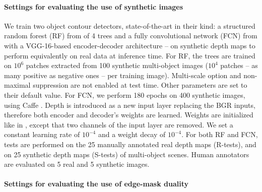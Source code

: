 \documentclass[runningheads,a4paper]{llncs}
\begin{document}
\paragraph{Settings for evaluating the use of synthetic images}

We train two object contour detectors, state-of-the-art in their kind: a structured random forest (RF) from \cite{DollarZ14} of 4 trees and a fully convolutional network (FCN) from \cite{Yang2016CEDN} with a VGG-16-based encoder-decoder architecture -- on synthetic depth maps to perform equivalently on real data at inference time. For RF, the trees are trained on $10^6$ patches extracted from 100 synthetic multi-object images ($10^4$ patches -- as many positive as negative ones -- per training image). Multi-scale option and non-maximal suppression are not enabled at test time. Other parameters are set to their default value. For FCN, we perform 180 epochs on 400 synthetic images, using Caffe \cite{jia2014caffe}. Depth is introduced as a new input layer replacing the BGR inputs, therefore both encoder and decoder's weights are learned. Weights are initialized like in \cite{Yang2016CEDN}, except that two channels of the input layer are removed. We set a constant learning rate of $10^{-4}$ and a weight decay of $10^{-4}$. For both RF and FCN, tests are performed on the 25 manually annotated real depth maps (R-tests), and on 25 synthetic depth maps (S-tests) of multi-object scenes. Human annotators are evaluated on 5 real and 5 synthetic images.

\paragraph{Settings for evaluating the use of edge-mask duality}
\end{document}
